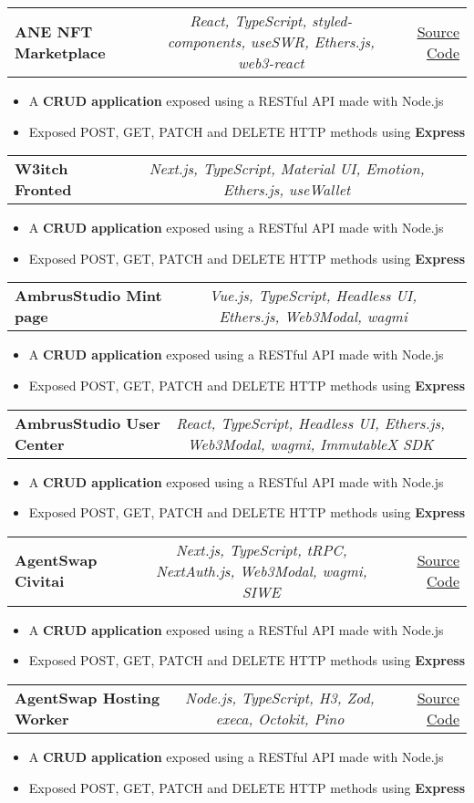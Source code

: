 \documentclass[a4paper,11pt]{article}
\makeatletter
\newcommand{\resumeItem}[1]{
  \item\small{#1}
}
\newcommand{\resumeItemListStart}{\begin{itemize}[rightmargin=0.11in]}
\newcommand{\resumeItemListEnd}{\end{itemize}}
\newcommand{\resumeTrioHeading}[3]{
  \item\small{
    \begin{tabular*}{0.96\textwidth}[t]{
      l@{\extracolsep{\fill}}c@{\extracolsep{\fill}}r
    }
      \textbf{#1} & \textit{#2} & #3
    \end{tabular*}
  }
}
\makeatother
\begin{document}
  \resumeTrioHeading{ANE NFT Marketplace}{React, TypeScript, styled-components, useSWR, Ethers.js, web3-react}{\href{https://github.com/Artnomics-org/art-and-economics}{\uline{Source Code}}}
  \resumeItemListStart{}
    \resumeItem{A \textbf{CRUD application} exposed using a RESTful API made with Node.js}
    \resumeItem{Exposed POST, GET, PATCH and DELETE HTTP methods using \textbf{Express}}
  \resumeItemListEnd{}

  \resumeTrioHeading{W3itch Fronted}{Next.js, TypeScript, Material UI, Emotion, Ethers.js, useWallet}{}
  \resumeItemListStart{}
    \resumeItem{A \textbf{CRUD application} exposed using a RESTful API made with Node.js}
    \resumeItem{Exposed POST, GET, PATCH and DELETE HTTP methods using \textbf{Express}}
  \resumeItemListEnd{}

  \resumeTrioHeading{AmbrusStudio Mint page}{Vue.js, TypeScript, Headless UI, Ethers.js, Web3Modal, wagmi}{}
  \resumeItemListStart{}
    \resumeItem{A \textbf{CRUD application} exposed using a RESTful API made with Node.js}
    \resumeItem{Exposed POST, GET, PATCH and DELETE HTTP methods using \textbf{Express}}
  \resumeItemListEnd{}

  \resumeTrioHeading{AmbrusStudio User Center}{React, TypeScript, Headless UI, Ethers.js, Web3Modal, wagmi, ImmutableX SDK}{}
  \resumeItemListStart{}
    \resumeItem{A \textbf{CRUD application} exposed using a RESTful API made with Node.js}
    \resumeItem{Exposed POST, GET, PATCH and DELETE HTTP methods using \textbf{Express}}
  \resumeItemListEnd{}

  \resumeTrioHeading{AgentSwap Civitai}{Next.js, TypeScript, tRPC, NextAuth.js, Web3Modal, wagmi, SIWE}{\href{https://github.com/agentswap/civitai}{\uline{Source Code}}}
  \resumeItemListStart{}
    \resumeItem{A \textbf{CRUD application} exposed using a RESTful API made with Node.js}
    \resumeItem{Exposed POST, GET, PATCH and DELETE HTTP methods using \textbf{Express}}
  \resumeItemListEnd{}

  \resumeTrioHeading{AgentSwap Hosting Worker}{Node.js, TypeScript, H3, Zod, execa, Octokit, Pino}{\href{https://github.com/agentswap/hosting-worker}{\uline{Source Code}}}
  \resumeItemListStart{}
    \resumeItem{A \textbf{CRUD application} exposed using a RESTful API made with Node.js}
    \resumeItem{Exposed POST, GET, PATCH and DELETE HTTP methods using \textbf{Express}}
  \resumeItemListEnd{}

\end{document}

